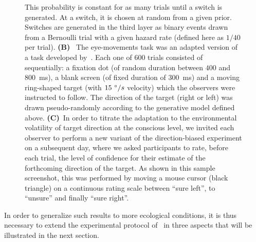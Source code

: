 \documentclass[12pt,english]{article}%
\newcommand{\ms}{\si{\milli\second}}%
\newcommand{\citet}[1]{\textcite{#1}}
\begin{document}
\begin{figure}
{This probability is constant for as many trials until a switch is generated. 
At a switch, it is  chosen at random from a given prior.
Switches are generated in the third layer as binary events drawn from a Bernoulli trial
with a given hazard rate (defined here as $1/40$ per trial).
\textbf{(B)}~
The eye-movements task was an adapted version of a task developed by~\citet{Montagnini2010}.
Each one of $600$ trials consisted of sequentially:
a fixation dot (of random duration between $400$ and $800$~\ms),
a blank screen (of fixed duration of  $300$~\ms) and
a moving ring-shaped target (with $15~\degree/s$ velocity) which the observers were instructed to follow.
The direction of the target (right or left) was drawn pseudo-randomly
according to the generative model defined above.
\textbf{(C)}~In order to titrate the adaptation
to the environmental volatility of target direction at the conscious level,
we invited each observer to perform a new variant of the direction-biased experiment on a subsequent day,
where we asked participants to rate, before each trial, the level of confidence
for their estimate of the forthcoming direction of the target.
As shown in this sample screenshot,
this was performed by moving a mouse cursor (black triangle) on a continuous rating scale
between ``sure left'', to ``unsure'' and finally ``sure right''.
}
\label{fig:intro}
\end{figure}
In order to generalize such results to more ecological conditions,
it is thus necessary to extend the experimental protocol of~\citet{Montagnini2010} in three aspects that will be illustrated in the next section.
\end{document}

